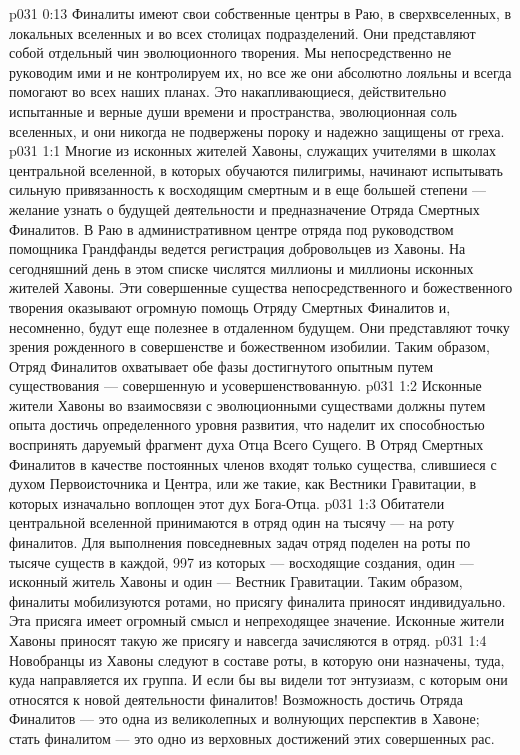 \vs p031 0:13 Финалиты имеют свои собственные центры в Раю, в сверхвселенных, в локальных вселенных и во всех столицах подразделений. Они представляют собой отдельный чин эволюционного творения. Мы непосредственно не руководим ими и не контролируем их, но все же они абсолютно лояльны и всегда помогают во всех наших планах. Это накапливающиеся, действительно испытанные и верные души времени и пространства, эволюционная соль вселенных, и они никогда не подвержены пороку и надежно защищены от греха.
\vs p031 1:1 Многие из исконных жителей Хавоны, служащих учителями в школах центральной вселенной, в которых обучаются пилигримы, начинают испытывать сильную привязанность к восходящим смертным и в еще большей степени --- желание узнать о будущей деятельности и предназначение Отряда Смертных Финалитов. В Раю в административном центре отряда под руководством помощника Грандфанды ведется регистрация добровольцев из Хавоны. На сегодняшний день в этом списке числятся миллионы и миллионы исконных жителей Хавоны. Эти совершенные существа непосредственного и божественного творения оказывают огромную помощь Отряду Смертных Финалитов и, несомненно, будут еще полезнее в отдаленном будущем. Они представляют точку зрения рожденного в совершенстве и божественном изобилии. Таким образом, Отряд Финалитов охватывает обе фазы достигнутого опытным путем существования --- совершенную и усовершенствованную.
\vs p031 1:2 Исконные жители Хавоны во взаимосвязи с эволюционными существами должны путем опыта достичь определенного уровня развития, что наделит их способностью воспринять даруемый фрагмент духа Отца Всего Сущего. В Отряд Смертных Финалитов в качестве постоянных членов входят только существа, слившиеся с духом Первоисточника и Центра, или же такие, как Вестники Гравитации, в которых изначально воплощен этот дух Бога\hyp{}Отца.
\vs p031 1:3 Обитатели центральной вселенной принимаются в отряд один на тысячу --- на роту финалитов. Для выполнения повседневных задач отряд поделен на роты по тысяче существ в каждой, 997 из которых --- восходящие создания, один --- исконный житель Хавоны и один --- Вестник Гравитации. Таким образом, финалиты мобилизуются ротами, но присягу финалита приносят индивидуально. Эта присяга имеет огромный смысл и непреходящее значение. Исконные жители Хавоны приносят такую же присягу и навсегда зачисляются в отряд.
\vs p031 1:4 Новобранцы из Хавоны следуют в составе роты, в которую они назначены, туда, куда направляется их группа. И если бы вы видели тот энтузиазм, с которым они относятся к новой деятельности финалитов! Возможность достичь Отряда Финалитов --- это одна из великолепных и волнующих перспектив в Хавоне; стать финалитом --- это одно из верховных достижений этих совершенных рас.
